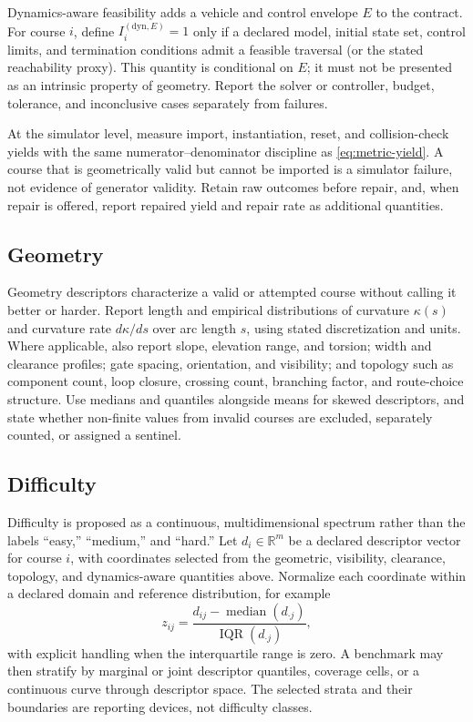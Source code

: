 Dynamics-aware feasibility adds a vehicle and control envelope $E$ to the contract.
For course $i$, define $I_i^{(\mathrm{dyn},E)}=1$ only if a declared model, initial
state set, control limits, and termination conditions admit a feasible traversal (or
the stated reachability proxy). This quantity is conditional on $E$; it must not be
presented as an intrinsic property of geometry. Report the solver or controller,
budget, tolerance, and inconclusive cases separately from failures.

At the simulator level, measure import, instantiation, reset, and collision-check
yields with the same numerator--denominator discipline as
\cref{eq:metric-yield}. A course that is geometrically valid but cannot be imported
is a simulator failure, not evidence of generator validity. Retain raw outcomes
before repair, and, when repair is offered, report repaired yield and repair rate as
additional quantities.

\subsection{Geometry}

Geometry descriptors characterize a valid or attempted course without calling it
better or harder. Report length and empirical distributions of curvature $\kappa(s)$
and curvature rate $d\kappa/ds$ over arc length $s$, using stated discretization and
units. Where applicable, also report slope, elevation range, and torsion; width and
clearance profiles; gate spacing, orientation, and visibility; and topology such as
component count, loop closure, crossing count, branching factor, and route-choice
structure. Use medians and quantiles alongside means for skewed descriptors, and
state whether non-finite values from invalid courses are excluded, separately counted,
or assigned a sentinel.

\subsection{Difficulty}

Difficulty is proposed as a continuous, multidimensional spectrum rather than the
labels ``easy,'' ``medium,'' and ``hard.'' Let $d_i\in\mathbb{R}^m$ be a declared
descriptor vector for course $i$, with coordinates selected from the geometric,
visibility, clearance, topology, and dynamics-aware quantities above. Normalize each
coordinate within a declared domain and reference distribution, for example
\begin{equation}
  z_{ij}=\frac{d_{ij}-\operatorname{median}(d_{\cdot j})}
  {\operatorname{IQR}(d_{\cdot j})},
  \label{eq:descriptor-normalization}
\end{equation}
with explicit handling when the interquartile range is zero. A benchmark may then
stratify by marginal or joint descriptor quantiles, coverage cells, or a continuous
curve through descriptor space. The selected strata and their boundaries are
reporting devices, not difficulty classes.

